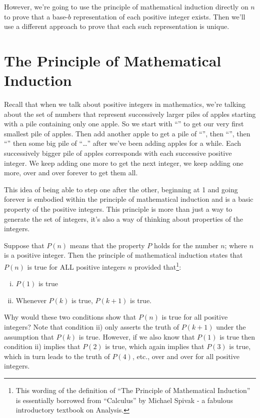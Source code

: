 \documentclass{article}
\begin{document}
However, we're going to use
the principle of mathematical induction directly on $n$
to prove that
a base-$b$ representation of each positive integer exists.
Then we'll use a different approach to prove that each such representation is unique.

\section*{The Principle of Mathematical Induction}

Recall that
when we talk about positive integers in mathematics, we're talking about
the set of numbers that
represent successively larger piles of apples starting
with a pile containing only one apple.
So we start with
``\faApple{}'' to get our very first
smallest pile of apples.
Then add another apple to get a pile of ``\faApple{}\faApple{}'',
then ``\faApple{}\faApple{}\faApple{}'',
then ``\faApple{}\faApple{}\faApple{}\faApple{}''
then some big pile of
``\faApple{}\faApple{}\faApple{}\faApple{}\faApple{}\dots{}\faApple{}\faApple{}\faApple{}''
after we've been adding apples for a while.
Each successively bigger pile of apples corresponds with each successive positive integer.
We keep adding one more to get the next integer, we keep adding one more,
over and over forever to get them all.

This idea of being able to step one after the other,
beginning at 1 and going forever is embodied within the principle of mathematical
induction and is a basic property of the positive integers.
This principle is more than just a way to generate the set of integers,
it's also a way of thinking about properties of the integers.

Suppose
that $P(n)$ means that the property $P$ holds
for the number $n$; where $n$ is a positive integer.
Then the principle of mathematical induction states that $P(n)$
is true for ALL positive integers $n$ provided that\footnote{This wording of the
definition of ``The Principle of Mathematical Induction'' is essentially borrowed
from ``Calculus'' by Michael Spivak - a fabulous introductory textbook on Analysis.}:

\begin{enumerate}[i)]
\item $P(1)$ is true
\item Whenever $P(k)$ is true, $P(k+1)$ is true.
\end{enumerate}

Why would these two conditions show that $P(n)$ is true for all
positive integers? Note that condition ii) only asserts the truth
of $P(k+1)$ under the assumption that $P(k)$ is true.
However, if we also know that $P(1)$ is true then condition ii) implies that $P(2)$ is true,
which again implies that $P(3)$ is true,
which in turn leads to the truth of $P(4)$,
etc., over and over for all positive integers.
\end{document}
